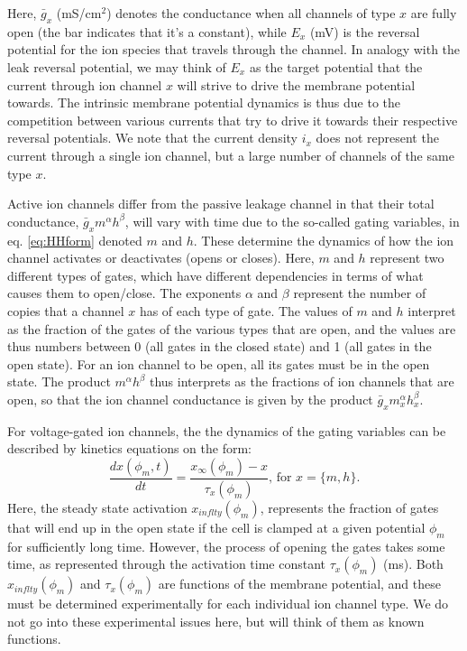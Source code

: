 Here, $\bar{g}_x$ (mS/cm$^2$) denotes the conductance when all channels of type $x$ are fully open (the bar indicates that it's a constant), while $E_x$ (mV) is the reversal potential for the ion species that travels through the channel. In analogy with the leak reversal potential, we may think of $E_x$ as the target potential that the current through ion channel $x$ will strive to drive the membrane potential towards. The intrinsic membrane potential dynamics is thus due to the competition between various currents that try to drive it towards their respective reversal potentials. We note that the current density $i_x$ does not represent the current through a single ion channel, but a large number of channels of the same type $x$. 

Active ion channels differ from the passive leakage channel in that their total conductance, $\bar{g}_{x} m^{\alpha} h^{\beta}$, will vary with time due to the so-called gating variables, in eq. \ref{eq:HHform} denoted $m$ and $h$. These determine the dynamics of how the ion channel activates or deactivates (opens or closes). Here, $m$ and $h$ represent two different types of gates, which have different dependencies in terms of what causes them to open/close. The exponents $\alpha$ and $\beta$ represent the number of copies that a channel $x$ has of each type of gate. The values of $m$ and $h$ interpret as the fraction of the gates of the various types that are open, and the values are thus numbers between 0 (all gates in the closed state) and 1 (all gates in the open state). For an ion channel to be open, all its gates must be in the open state. The product $m^{\alpha} h^{\beta}$ thus interprets as the fractions of ion channels that are open, so that the ion channel conductance is given by the product $\bar{g}_x m_x^{\alpha} h_x^{\beta}$.

For voltage-gated ion channels, the the dynamics of the gating variables can be described by kinetics equations on the form:
\begin{equation}
\frac{dx(\phi_m,t)}{dt} = \frac{x_{\infty}(\phi_m) - x}{\tau_x(\phi_m)},  \, \text{for } x = \{m,h\}.
\label{eq:HHgate}
\end{equation}
Here, the steady state activation $x_{inflty}(\phi_m)$, represents the fraction of gates that will end up in the open state if the cell is clamped at a given potential $\phi_m$ for sufficiently long time. However, the process of opening the gates takes some time, as represented through the activation time constant $\tau_x(\phi_m)$ (ms). Both $x_{inflty}(\phi_m)$ and $\tau_x(\phi_m)$ are functions of the membrane potential, and these must be determined experimentally for each individual ion channel type. We do not go into these experimental issues here, but will think of them as known functions. 

